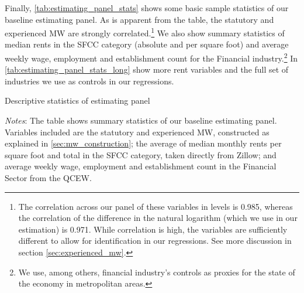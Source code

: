 Finally, \autoref{tab:estimating_panel_stats} shows some basic sample statistics of our 
baseline estimating panel. As is apparent from the table, the statutory and experienced
MW are strongly correlated.\footnote{The correlation across our panel of these variables 
	in levels is 0.985, whereas the correlation of the difference in the natural logarithm 
	(which we use in our estimation) is 0.971. While correlation is high, the variables 
	are sufficiently different to allow for identification in our regressions. See more
	discussion in section \ref{sec:experienced_mw}.}
We also show summary statistics of median rents in the SFCC category (absolute and per 
square foot) and average weekly wage, employment and establishment count for the Financial 
industry.\footnote{We use, among others, financial industry's controls as proxies for the state of the economy in metropolitan areas.} In \autoref{tab:estimating_panel_stats_long} show more rent variables and the full set of industries we use as controls in our regressions.

\begin{table}[h!]
	\caption{Descriptive statistics of estimating panel}
	\centering
	\label{tab:estimating_panel_stats}    
	
	\begin{minipage}{0.95\textwidth} \footnotesize
		\vspace{3mm} 
		\textit{Notes}: The table shows summary statistics of our baseline estimating panel.
		Variables included are the statutory and experienced MW, constructed as explained in
		\autoref{sec:mw_construction}; the average of median monthly rents per square foot 
		and total in the SFCC category, taken directly from Zillow; and average weekly wage, 
		employment and establishment count in the Financial Sector from the QCEW.
	\end{minipage}
\end{table}
